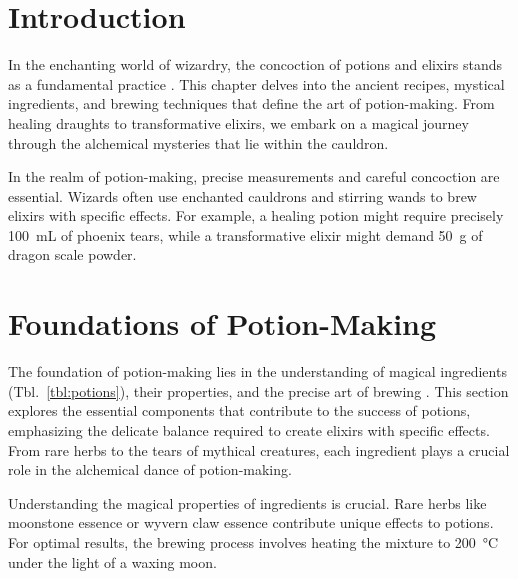 
\section{Introduction}
In the enchanting world of wizardry, the concoction of potions and elixirs stands as a fundamental practice \cite{personalgrimoires2013}. This chapter delves into the ancient recipes, mystical ingredients, and brewing techniques that define the art of potion-making. From healing draughts to transformative elixirs, we embark on a magical journey through the alchemical mysteries that lie within the cauldron.

In the realm of potion-making, precise measurements and careful concoction are essential. Wizards often use enchanted cauldrons and stirring wands to brew elixirs with specific effects. For example, a healing potion might require precisely \SI{100}{\milli\liter} of phoenix tears, while a transformative elixir might demand \SI{50}{\gram} of dragon scale powder.

\section{Foundations of Potion-Making}

The foundation of potion-making lies in the understanding of magical ingredients (Tbl.~\ref{tbl:potions}), their properties, and the precise art of brewing \cite{rareingredients2020}. This section explores the essential components that contribute to the success of potions, emphasizing the delicate balance required to create elixirs with specific effects. From rare herbs to the tears of mythical creatures, each ingredient plays a crucial role in the alchemical dance of potion-making.

Understanding the magical properties of ingredients is crucial. Rare herbs like moonstone essence or wyvern claw essence contribute unique effects to potions. For optimal results, the brewing process involves heating the mixture to \SI{200}{\celsius} under the light of a waxing moon.

